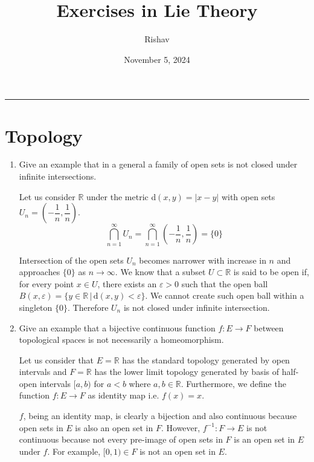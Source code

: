 \documentclass{article}
\title{Exercises in Lie Theory}
\date{November 5, 2024}
\author{Rishav}
\begin{document}
\maketitle
\hrule
\tableofcontents
\newpage

\section{Topology}

\begin{enumerate}
  \item Give an example that in a general a family of open sets is not closed under infinite intersections.

  \begin{ans_box}
    Let us consider $\mathbb{R}$ under the metric d$(x,y)=|x-y|$ with open sets $U_{n}=\left(-\dfrac{1}{n},\dfrac{1}{n}\right)$.$$\bigcap_{n=1}^{\infty}U_{n}=\bigcap_{n=1}^{\infty}\left(-\dfrac{1}{n},\dfrac{1}{n}\right)=\{0\}$$

  Intersection of the open sets $U_{n}$ becomes narrower with increase in $n$ and approaches $\{0\}$ as $n\rightarrow\infty$. We know that a subset $U\subset\mathbb{R}$ is said to be open if, for every point $x\in U$, there exists an $\varepsilon>0$ such that the open ball $B(x,\varepsilon)=\{y\in\mathbb{R}\,|\,\text{d}(x,y)<\varepsilon\}$. We cannot create such open ball within a singleton $\{0\}$. Therefore $U_{n}$ is not closed under infinite intersection.
  \end{ans_box}

  \item Give an example that a bijective continuous function $f:E\rightarrow F$ between topological spaces is not necessarily a homeomorphism.

  \begin{ans_box}
    Let us consider that $E=\mathbb{R}$ has the standard topology generated by open intervals and $F=\mathbb{R}$ has the lower limit topology generated by basis of half-open intervals $[a,b)$ for $a<b$ where $a,b\in\mathbb{R}$. Furthermore, we define the function $f:E\rightarrow F$ as identity map i.e. $f(x)=x$.\medskip

  $f$, being an identity map, is clearly a bijection and also continuous because open sets in $E$ is also an open set in $F$. However, $f^{-1}:F\rightarrow E$ is not continuous because not every pre-image of open sets in $F$ is an open set in $E$ under $f$. For example, $[0,1)\in F$ is not an open set in $E$.
  \end{ans_box}
\end{enumerate}
\end{document}
